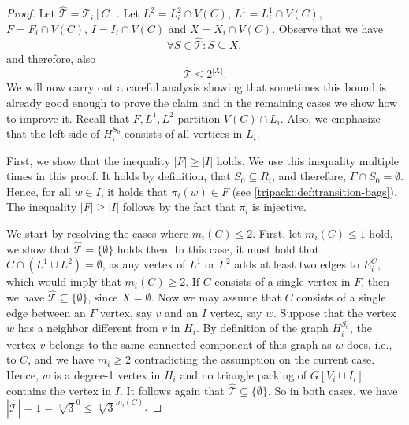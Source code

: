 \documentclass[a4paper,UKenglish,cleveref, autoref, thm-restate]{lipics-v2021}
\begin{document}
\begin{proof}
    Let $\hat{\mathcal{T}} = \mathcal{T}_i[C]$.
    Let $L^2 = L^2_i \cap V(C)$, $L^1 = L^1_i \cap V(C)$, $F = F_i \cap V(C)$, $I = I_i \cap V(C)$ and $X = X_i \cap V(C)$.
    Observe that we have 
    \begin{equation}\label{eq:subset-of-x}
        \forall S \in \hat{\mathcal{T}} \colon S \subseteq X,
    \end{equation}
    and therefore, also
    \begin{equation}\label{eq:states-subsets-of-x}
        \hat{\mathcal{T}} \leq 2^{|X|}.
    \end{equation}
    We will now carry out a careful analysis showing that sometimes this bound is already good enough to prove the claim and in the remaining cases we show how to improve it.
    Recall that $F, L^1, L^2$ partition $V(C) \cap  L_i$.
    Also, we emphasize that the left side of $H_i^{S_0}$ consists of all vertices in $L_i$.

    First, we show that the inequality $|F|\geq |I|$ holds. We use this inequality multiple times in this proof.
    It holds by definition, that $S_0 \subseteq R_i$, and therefore, $F \cap S_0 = \emptyset$. Hence, for all $w \in I$, it holds that $\pi_i(w)\in F$ (see \cref{tripack::def:transition-bags}).
    The inequality $|F| \geq |I|$ follows by the fact that $\pi_i$ is injective.

    We start by resolving the cases where $m_{i}(C)\leq 2$.
    First, let $m_{i}(C) \leq 1$ hold, we show that $\hat{\mathcal{T}} = \{\emptyset\}$ holds then.
    In this case, it must hold that $C\cap(L^1\cup L^2) = \emptyset$, as any vertex of $L^1$ or $L^2$ adds at least two edges to $E_i^C$, which would imply that $m_{i}(C) \geq 2$.
    If $C$ consists of a single vertex in $F$, then we have $\hat{\mathcal{T}} \subseteq \{\emptyset\}$, since $X=\emptyset$.
    Now we may assume that $C$ consists of a single edge between an $F$ vertex, say $v$ and an $I$ vertex, say $w$.
    Suppose that the vertex $w$ has a neighbor different from $v$ in $H_i$.
    By definition of the graph $H_i^{S_0}$, the vertex $v$ belongs to the same connected component of this graph as $w$ does, i.e., to $C$, and we have $m_{i} \geq 2$ contradicting the assumption on the current case.
    Hence, $w$ is a degree-1 vertex in $H_i$ and no triangle packing of $G[V_i \cup I_i]$ contains the vertex in $I$. It follows again that $\hat{\mathcal{T}} \subseteq \{\emptyset\}$.
    So in both cases, we have
    $|\hat{\mathcal{T}}| = 1 = \sqrt[3]{3}^{0} \leq \sqrt[3]{3}^{m_{i}(C)}$.
    

\end{proof}
\end{document}
